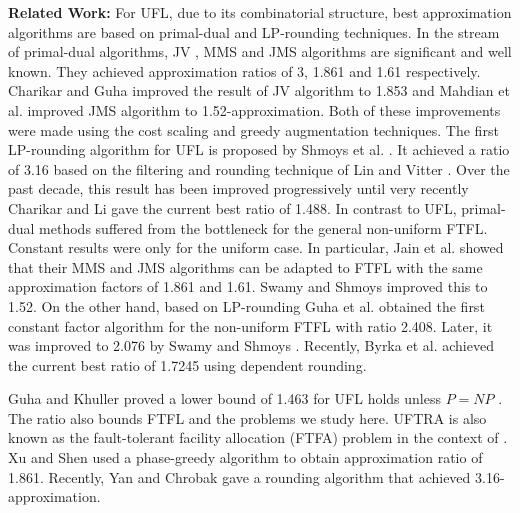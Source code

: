 \documentclass[10pt]{llncs}
\begin{document}
\textbf{Related Work: }For UFL, due to its combinatorial structure,
best approximation algorithms are based on primal-dual and LP-rounding
techniques. In the stream of primal-dual algorithms, JV \cite{jain01approximation},
MMS \cite{Mohammad1.861} and JMS \cite{Jain02greedy} algorithms
are significant and well known. They achieved approximation ratios
of 3, 1.861 and 1.61 respectively. Charikar and Guha \cite{Charikar051.7281.853}
improved the result of JV algorithm to 1.853 and Mahdian et al. \cite{Mohammad06FLP}
improved JMS algorithm to 1.52-approximation. Both of these improvements
were made using the cost scaling and greedy augmentation techniques.
The first LP-rounding algorithm for UFL is proposed by Shmoys et al.
\cite{Shmoys97FL}. It achieved a ratio of 3.16 based on the filtering
and rounding technique of Lin and Vitter \cite{Lin92filting}. Over
the past decade, this result has been improved progressively until
very recently Charikar and Li \cite{charikar2011novel} gave the current
best ratio of 1.488. In contrast to UFL, primal-dual methods suffered
from the bottleneck \cite{Jain00FTFL} for the general non-uniform
FTFL. Constant results were only for the uniform case. In particular,
Jain et al. \cite{Jain03dualfitting} showed that their MMS and JMS
algorithms can be adapted to FTFL with the same approximation factors
of 1.861 and 1.61. Swamy and Shmoys \cite{Swamy08FTFL2.076} improved
this to 1.52. On the other hand, based on LP-rounding Guha et al.
\cite{Guha01FTFL2.47,Guha03FTFL2.41} obtained the first constant
factor algorithm for the non-uniform FTFL with ratio 2.408. Later,
it was improved to 2.076 by Swamy and Shmoys \cite{Swamy08FTFL2.076}.
Recently, Byrka et al. \cite{JaroslawFTFL1.725} achieved the current
best ratio of 1.7245 using dependent rounding. 

Guha and Khuller \cite{Guha99greedy} proved a lower bound of 1.463
for UFL holds unless $P=NP$ \cite{chudak2005improved}. The ratio
also bounds FTFL and the problems we study here. UFTRA is also known
as the fault-tolerant facility allocation (FTFA) problem in the context
of \cite{shihongftfa}. Xu and Shen used a phase-greedy algorithm
to obtain approximation ratio of 1.861. Recently, Yan and Chrobak
\cite{yan2011approximation} gave a rounding algorithm that achieved
3.16-approximation.
\end{document}

